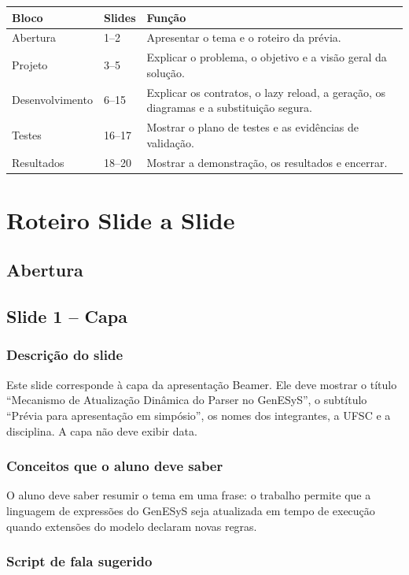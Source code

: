 \documentclass[12pt,a4paper]{article}
\newcommand{\slide}[2]{\subsection{Slide #1 -- #2}}
\begin{document}
\begin{longtable}{p{} p{} p{}}
\toprule
\textbf{Bloco} & \textbf{Slides} & \textbf{Fun\c{c}\~ao} \\
\midrule
\endhead
Abertura & 1--2 & Apresentar o tema e o roteiro da pr\'evia. \\
Projeto & 3--5 & Explicar o problema, o objetivo e a vis\~ao geral da solu\c{c}\~ao. \\
Desenvolvimento & 6--15 & Explicar os contratos, o lazy reload, a gera\c{c}\~ao, os diagramas e a substitui\c{c}\~ao segura. \\
Testes & 16--17 & Mostrar o plano de testes e as evid\^encias de valida\c{c}\~ao. \\
Resultados & 18--20 & Mostrar a demonstra\c{c}\~ao, os resultados e encerrar. \\
\bottomrule
\end{longtable}

\section{Roteiro Slide a Slide}

\subsection*{Abertura}

\slide{1}{Capa}

\subsubsection*{Descri\c{c}\~ao do slide}

Este slide corresponde \`a capa da apresenta\c{c}\~ao Beamer. Ele deve mostrar o t\'itulo ``Mecanismo de Atualiza\c{c}\~ao Din\^amica do Parser no GenESyS'', o subt\'itulo ``Pr\'evia para apresenta\c{c}\~ao em simp\'osio'', os nomes dos integrantes, a UFSC e a disciplina. A capa n\~ao deve exibir data.

\subsubsection*{Conceitos que o aluno deve saber}

O aluno deve saber resumir o tema em uma frase: o trabalho permite que a linguagem de express\~oes do GenESyS seja atualizada em tempo de execu\c{c}\~ao quando extens\~oes do modelo declaram novas regras.

\subsubsection*{Script de fala sugerido}
\end{document}
